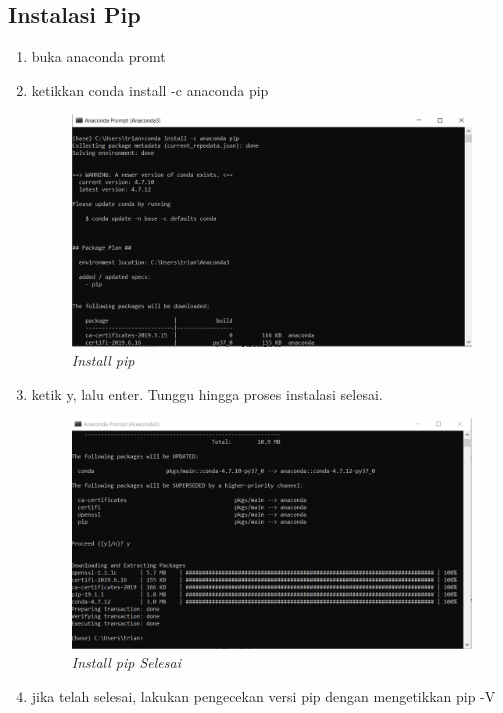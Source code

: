 \subsection{Instalasi Pip}
\begin{enumerate}
\item buka anaconda promt
\item ketikkan conda install -c anaconda pip
\begin{figure}[H]
    \centering
    \includegraphics[scale=0.5]{figures/installpip}
    \caption{\textit{Install pip}}
    \label{Figureanaconda70}
\end{figure}
\item ketik y, lalu enter. Tunggu hingga proses instalasi selesai.
\begin{figure}[H]
    \centering
    \includegraphics[scale=0.5]{figures/pipselesai}
    \caption{\textit{Install pip Selesai}}
    \label{Figureanaconda70}
\end{figure}
\item jika telah selesai, lakukan pengecekan versi pip dengan mengetikkan pip -V
\begin{figure}[H]

\end{figure}
\end{enumerate}
